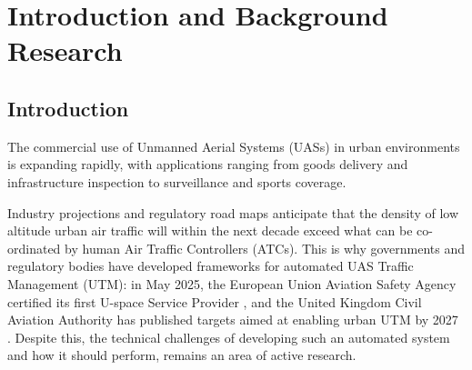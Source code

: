 \chapter{Introduction and Background Research}

\label{chapter1}

\section{Introduction}

The commercial use of Unmanned Aerial Systems (UASs) in urban environments is expanding rapidly, with applications ranging from goods delivery and infrastructure inspection to surveillance and sports coverage. \par

\vspace{1em}

Industry projections and regulatory road maps anticipate that the density of low altitude urban air traffic will within the next decade  exceed what can be co-ordinated by human Air Traffic Controllers (ATCs). This is why governments and regulatory bodies have developed frameworks for automated UAS Traffic Management (UTM): in May 2025, the European Union Aviation Safety Agency certified its first U-space Service Provider \cite{easa2025anra}, and the United Kingdom Civil Aviation Authority has published targets aimed at enabling urban UTM by 2027 \cite{caa2024bvlos}. Despite this, the technical challenges of developing such an automated system and how it should perform, remains an area of active research. \par

\vspace{1em}

